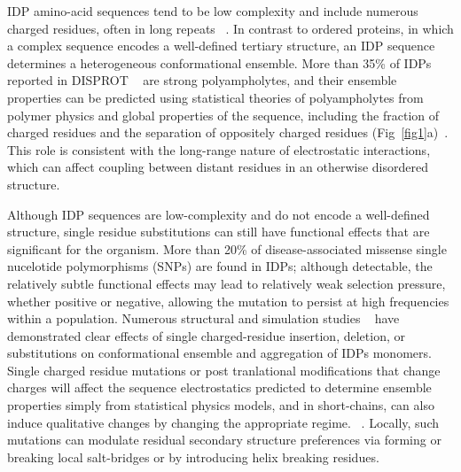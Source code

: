 \documentclass[10pt,letterpaper]{article}
\begin{document}
IDP amino-acid sequences tend to be low complexity and include numerous charged residues, often in long repeats ~\cite{Uversky2013a}. In contrast to ordered proteins, in which a complex sequence encodes a well-defined tertiary structure, an IDP sequence determines a heterogeneous conformational ensemble.  More than 35\% of 
IDPs reported in DISPROT ~\cite {Sickmeier2007a} are strong polyampholytes, and their ensemble properties can be predicted using statistical theories of polyampholytes from polymer physics and global properties of the sequence, including the fraction of charged residues and the separation of oppositely charged residues (Fig~\ref{fig1}a)~\cite{Das2015,Das2013a}.  This role is consistent with the long-range nature of electrostatic interactions, which can affect coupling between distant residues in an otherwise disordered structure.  


Although IDP sequences are low-complexity and do not encode a well-defined structure, single residue substitutions can still have functional effects that are significant for the organism.  More than 20\% of disease-associated missense single nucelotide polymorphisms (SNPs) are found in IDPs;\cite{Vacic2012a} although detectable, the relatively subtle functional effects may lead to relatively weak selection pressure, whether positive or negative, allowing the mutation to persist at high frequencies within a population.  Numerous structural and simulation studies ~\cite{Larini2013b,Ganguly2015,Viet2014a,Viet2013,Truong2014a,Zhan2013a,Xu2013a} have demonstrated clear effects of single charged-residue insertion, deletion, or substitutions on conformational ensemble and aggregation of IDPs monomers. Single charged residue mutations or post tranlational modifications that change charges will affect the sequence electrostatics %
predicted to determine ensemble properties simply from statistical physics models, and in short-chains, can also induce qualitative changes by changing the appropriate regime. ~\cite{Das2015,Larini2013b,Bah2016,He2015}. 
Locally, such mutations can modulate residual secondary structure preferences via forming or breaking local salt-bridges or by introducing helix breaking residues. ~\cite{AlexanderConicella2016,Ganguly2015,Zhan2013a}
  
\end{document}
